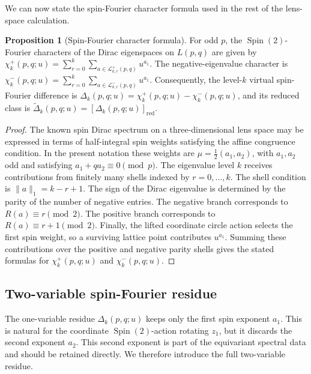 \documentclass{article}
\theoremstyle{definition}
\newtheorem{proposition}[theorem]{Proposition}
\DeclareMathOperator{\Spin}{Spin}
\numberwithin{equation}{section}
\begin{document}
We can now state the spin-Fourier character formula used in the rest of the lens-space calculation.

\begin{proposition}[Spin-Fourier character formula]
For odd $p$, the $\operatorname{Spin}(2)$-Fourier characters of the Dirac eigenspaces on $L(p,q)$ are given by $\chi_k^+(p,q;u)=\sum_{r=0}^{k}\sum_{a\in\mathcal L_{k,r}^+(p,q)}u^{a_1}.$ The negative-eigenvalue character is $\chi_k^-(p,q;u)=\sum_{r=0}^{k}\sum_{a\in\mathcal L_{k,r}^-(p,q)}u^{a_1}.$ Consequently, the level-$k$ virtual spin-Fourier difference is $\Delta_k(p,q;u)=\chi_k^+(p,q;u)-\chi_k^-(p,q;u)$, and its reduced class is $\widetilde\Delta_k(p,q;u)=[\Delta_k(p,q;u)]_{\operatorname{red}}$. \end{proposition}

\begin{proof}
The known spin Dirac spectrum on a three-dimensional lens space may be expressed in terms of half-integral spin weights satisfying the affine congruence condition.  In the present notation these weights are $\mu=\frac12(a_1,a_2)$, with $a_1,a_2$ odd and satisfying $a_1+q a_2\equiv0\pmod p.$ The eigenvalue level $k$ receives contributions from finitely many shells indexed by $r=0,\ldots,k$.  The shell condition is $\|a\|_1=k-r+1.$ The sign of the Dirac eigenvalue is determined by the parity of the number of negative entries.  The negative branch corresponds to $R(a)\equiv r\pmod2.$ The positive branch corresponds to $R(a)\equiv r+1\pmod2.$ Finally, the lifted coordinate circle action selects the first spin weight, so a surviving lattice point contributes $u^{a_1}$.  Summing these contributions over the positive and negative parity shells gives the stated formulas for $\chi_k^+(p,q;u)$ and $\chi_k^-(p,q;u)$.
\end{proof}


\subsection{Two-variable spin-Fourier residue}
\label{subsec:two-variable-residue}

The one-variable residue $\Delta_k(p,q;u)$ keeps only the first spin exponent $a_1$.  This is natural for the coordinate $\Spin(2)$-action rotating $z_1$, but it discards the second exponent $a_2$.  This second exponent is part of the equivariant spectral data and should be retained directly.  We therefore introduce the full two-variable residue.
\end{document}
